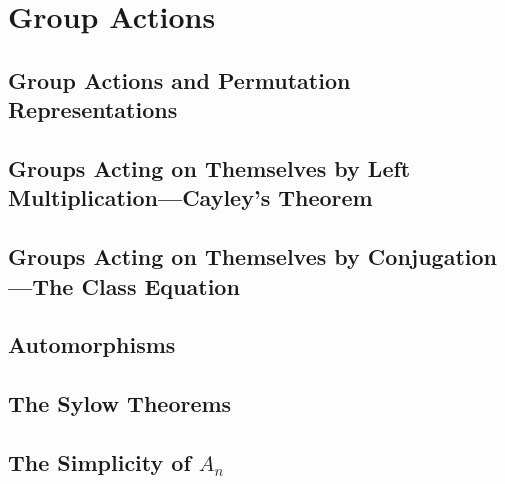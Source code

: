 \chapter{Group Actions}

\section{Group Actions and Permutation Representations}

\section{Groups Acting on Themselves by Left Multiplication—Cayley's Theorem}

\section{Groups Acting on Themselves by Conjugation—The Class Equation}

\section{Automorphisms}

\section{The Sylow Theorems}

\section{The Simplicity of $A_n$}

